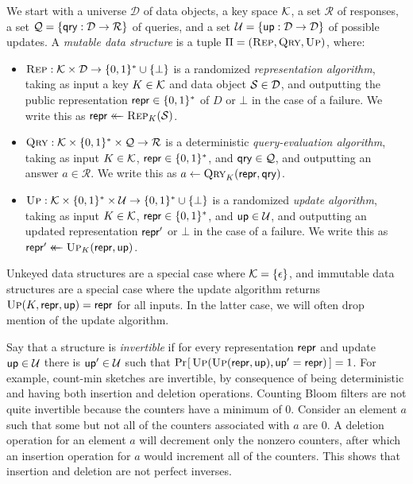 We start with a universe $\mathcal{D}$ of data objects, a key space $\mathcal{K}$, a set $\mathcal{R}$ of responses, a set $\mathcal{Q} = \{\mathsf{qry}: \mathcal{D} \to \mathcal{R}\}$ of queries, and a set $\mathcal{U} = \{\mathsf{up}: \mathcal{D} \to \mathcal{D}\}$ of possible updates. A {\em mutable data structure} is a tuple $\Pi = (\textsc{Rep},\textsc{Qry},\textsc{Up})$, where:

\begin{itemize}
  \item $\textsc{Rep}: \mathcal{K} \times \mathcal{D} \to \{0,1\}^* \cup \{\bot\}$ is a randomized {\em representation algorithm}, taking as input a key $K \in \mathcal{K}$ and data object $\mathcal{S} \in \mathcal{D}$, and outputting the public representation $\mathsf{repr} \in \{0,1\}^*$ of $D$ or $\bot$ in the case of a failure. We write this as $\mathsf{repr} \mathrel{\leftarrow\mkern-14mu\leftarrow} \textsc{Rep}_K(\mathcal{S})$.
  \item $\textsc{Qry}: \mathcal{K} \times \{0,1\}^* \times \mathcal{Q} \to \mathcal{R}$ is a deterministic {\em query-evaluation algorithm}, taking as input $K \in \mathcal{K}$, $\mathsf{repr} \in \{0,1\}^*$, and $\mathsf{qry} \in \mathcal{Q}$, and outputting an answer $a \in \mathcal{R}$. We write this as $a \gets \textsc{Qry}_K(\mathsf{repr},\mathsf{qry})$.
  \item $\textsc{Up}: \mathcal{K} \times \{0,1\}^* \times \mathcal{U} \to \{0,1\}^* \cup \{\bot\}$ is a randomized {\em update algorithm}, taking as input $K \in \mathcal{K}$, $\mathsf{repr} \in \{0,1\}^*$, and $\mathsf{up} \in \mathcal{U}$, and outputting an updated representation $\mathsf{repr}'$ or $\bot$ in the case of a failure. We write this as $\mathsf{repr}' \mathrel{\leftarrow\mkern-14mu\leftarrow} \textsc{Up}_K(\mathsf{repr},\mathsf{up})$.
\end{itemize}

Unkeyed data structures are a special case where $\mathcal{K} = \{\epsilon\}$, and immutable data structures are a special case where the update algorithm returns $\textsc{Up}(K,\mathsf{repr},\mathsf{up})=\mathsf{repr}$ for all inputs.  In the latter case, we will often drop mention of the update algorithm.


Say that a structure is {\em invertible} if for every representation $\mathsf{repr}$ and update $\mathsf{up} \in \mathcal{U}$ there is $\mathsf{up}' \in \mathcal{U}$ such that $\Pr\hspace{-1pt}\left[\,\textsc{Up}(\textsc{Up}(\mathsf{repr},\mathsf{up}),\mathsf{up}' = \mathsf{repr})\,\right] = 1$.  For example, count-min sketches are invertible, by consequence of being deterministic and having both insertion and deletion operations. Counting Bloom filters are not quite invertible because the counters have a minimum of 0. Consider an element $a$ such that some but not all of the counters associated with $a$ are 0. A deletion operation for an element $a$ will decrement only the nonzero counters, after which an insertion operation for $a$ would increment all of the counters. This shows that insertion and deletion are not perfect inverses.

